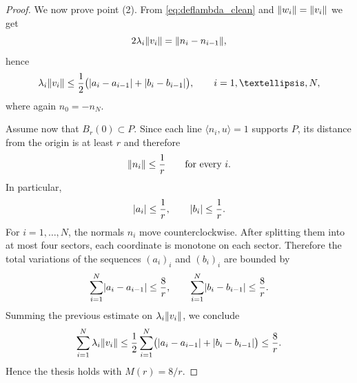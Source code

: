 \documentclass[10pt,a4paper]{amsart}
\DeclarePairedDelimiter{\norma}{\lVert}{\rVert} %
\DeclarePairedDelimiter{\valass}{\lvert}{\rvert} %
\newcommand{\prodscal}[2]{\langle{#1} , {#2} \rangle}
\begin{document}
\begin{proof}
We now prove point (2). From \eqref{eq:deflambda_clean} and $\norma{w_i}=\norma{v_i}$ we get
$$
2\lambda_i \norma{v_i} = \norma{n_i-n_{i-1}},
$$
hence
$$
\lambda_i\norma{v_i}
\le
\frac12\bigl(\valass{a_i-a_{i-1}}+\valass{b_i-b_{i-1}}\bigr),
\qquad i=1,\dots,N,
$$
where again $n_0=-n_N$.

Assume now that $B_r(0)\subset P$. Since each line $\prodscal{n_i}{u}=1$ supports $P$, its distance from the origin is at least $r$ and therefore
$$
\norma{n_i}\le \frac1r
\qquad\text{for every }i.
$$
In particular,
$$
\valass{a_i}\le \frac1r,
\qquad
\valass{b_i}\le \frac1r.
$$
For $i=1,\dots,N$, the normals $n_i$ move counterclockwise. After splitting them into at most four sectors, each coordinate is monotone on each sector. Therefore the total variations of the sequences $(a_i)_i$ and $(b_i)_i$ are bounded by
$$
\sum_{i=1}^{N}\valass{a_i-a_{i-1}}\le \frac{8}{r},
\qquad
\sum_{i=1}^{N}\valass{b_i-b_{i-1}}\le \frac{8}{r}.
$$
Summing the previous estimate on $\lambda_i\norma{v_i}$, we conclude
$$
\sum_{i=1}^{N}\lambda_i\norma{v_i}
\le
\frac12
\sum_{i=1}^{N}\bigl(\valass{a_i-a_{i-1}}+\valass{b_i-b_{i-1}}\bigr)
\le \frac{8}{r}.
$$
Hence the thesis holds with $M(r)=8/r$.
\end{proof}
\end{document}
